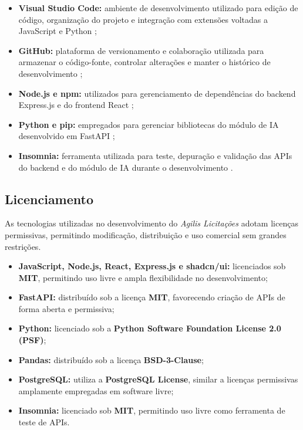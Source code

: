 \begin{itemize}
    \item \textbf{Visual Studio Code:} ambiente de desenvolvimento utilizado para edição de código, organização do projeto e integração com extensões voltadas a JavaScript e Python \cite{vscode_docs_2024};
    
    \item \textbf{GitHub:} plataforma de versionamento e colaboração utilizada para armazenar o código-fonte, controlar alterações e manter o histórico de desenvolvimento \cite{github_docs_2024};
    
    \item \textbf{Node.js e npm:} utilizados para gerenciamento de dependências do backend Express.js e do frontend React \cite{nodejs_docs_2024};
    
    \item \textbf{Python e pip:} empregados para gerenciar bibliotecas do módulo de IA desenvolvido em FastAPI \cite{python_docs_2024};
    
    \item \textbf{Insomnia:} ferramenta utilizada para teste, depuração e validação das APIs do backend e do módulo de IA durante o desenvolvimento \cite{insomnia_docs_2024}.
\end{itemize}


\subsection{Licenciamento}

As tecnologias utilizadas no desenvolvimento do \textit{Agilis Licitações} adotam licenças permissivas, permitindo modificação, distribuição e uso comercial sem grandes restrições.

\begin{itemize}
    \item \textbf{JavaScript, Node.js, React, Express.js e shadcn/ui:} licenciados sob \textbf{MIT}, permitindo uso livre e ampla flexibilidade no desenvolvimento;
    
    \item \textbf{FastAPI:} distribuído sob a licença \textbf{MIT}, favorecendo criação de APIs de forma aberta e permissiva;
    
    \item \textbf{Python:} licenciado sob a \textbf{Python Software Foundation License 2.0 (PSF)};
    
    \item \textbf{Pandas:} distribuído sob a licença \textbf{BSD-3-Clause};
    
    \item \textbf{PostgreSQL:} utiliza a \textbf{PostgreSQL License}, similar a licenças permissivas amplamente empregadas em software livre;
    
    \item \textbf{Insomnia:} licenciado sob \textbf{MIT}, permitindo uso livre como ferramenta de teste de APIs.
\end{itemize}


